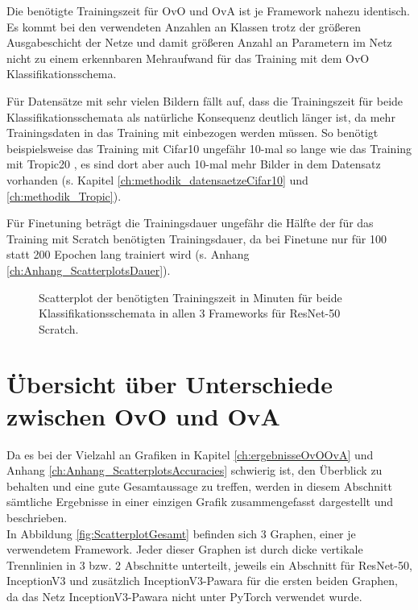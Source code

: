 Die benötigte Trainingszeit für OvO und OvA ist je Framework nahezu identisch. Es kommt bei den verwendeten Anzahlen an Klassen trotz der größeren Ausgabeschicht der Netze und damit größeren Anzahl an Parametern im Netz nicht zu einem erkennbaren Mehraufwand für das Training mit dem OvO Klassifikationsschema.

Für Datensätze mit sehr vielen Bildern fällt auf, dass die Trainingszeit für beide Klassifikationsschemata als natürliche Konsequenz deutlich länger ist, da mehr Trainingsdaten in das Training mit einbezogen werden müssen. So benötigt beispielsweise das Training mit Cifar10 \cite{cifar10} ungefähr 10-mal so lange wie das Training mit Tropic20 \cite{pawaraWebsiteDatensaetze}, es sind dort aber auch 10-mal mehr Bilder in dem Datensatz vorhanden (s. Kapitel \ref{ch:methodik_datensaetzeCifar10} und \ref{ch:methodik_Tropic}).

Für Finetuning beträgt die Trainingsdauer ungefähr die Hälfte der für das Training mit Scratch benötigten Trainingsdauer, da bei Finetune nur für 100 statt 200 Epochen lang trainiert wird (s. Anhang \ref{ch:Anhang_ScatterplotsDauer}).


\begin{figure}[H]
\hspace*{-1.5cm}

\caption{Scatterplot der benötigten Trainingszeit in Minuten für beide Klassifikationsschemata in allen 3 Frameworks für ResNet-50 Scratch.}
\label{fig:ScatterplotRS-dauer}
\end{figure}

\section{Übersicht über Unterschiede zwischen OvO und OvA}
Da es bei der Vielzahl an Grafiken in Kapitel \ref{ch:ergebnisseOvOOvA} und Anhang \ref{ch:Anhang_ScatterplotsAccuracies} schwierig ist, den Überblick zu behalten und eine gute Gesamtaussage zu treffen, werden in diesem Abschnitt sämtliche Ergebnisse in einer einzigen Grafik zusammengefasst dargestellt und beschrieben.\\

In Abbildung \ref{fig:ScatterplotGesamt} befinden sich 3 Graphen, einer je verwendetem Framework.
Jeder dieser Graphen ist durch dicke vertikale Trennlinien in 3 bzw. 2 Abschnitte unterteilt, jeweils ein Abschnitt für ResNet-50, InceptionV3 und zusätzlich InceptionV3-Pawara für die ersten beiden Graphen, da das Netz InceptionV3-Pawara nicht unter PyTorch \cite{pytorch} verwendet wurde.

